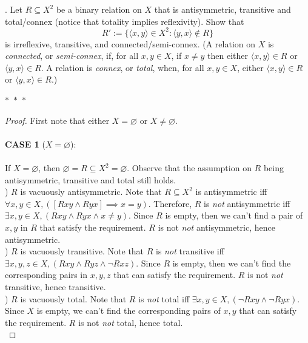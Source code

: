 \documentclass[12pt]{article}
\begin{document}
\newpage
{}. Let $R \subseteq X^2$ be a binary relation on $X$ that is antisymmetric, 
transitive and total/connex (notice that totality implies reflexivity). Show that 
$$R' := \{\langle x,y \rangle \in X^2: \langle y, x \rangle \notin R\}$$
\noindent
is irreflexive, transitive, and connected/semi-connex. (A relation on $X$  is \emph{connected}, 
or \emph{semi-connex}, if, for all $x,y \in X$, if $x\neq y$ then 
either $\langle x, y \rangle \in R$ or $\langle y, x \rangle \in R$. A relation 
is \emph{connex}, or \emph{total}, when, for all $x,y \in X$, either $\langle x, 
y \rangle \in R$ or $\langle y, x \rangle \in R$.)
\begin{center}
    $\ast$~$\ast$~$\ast$
\end{center}
\begin{proof}
    First note that either $X = \varnothing$ or $X \neq \varnothing$.\\
    \\
    \textbf{CASE 1 }($X = \varnothing$):\\
    \\
    If $X = \varnothing$, then $\varnothing = R \subseteq X^2 = \varnothing$. 
    Observe that the assumption on $R$ being antisymmetric, transitive and total still holds.\\
    
    ) $R$ is vacuously antisymmetric. Note that $R \subseteq X^2$ is antisymmetric iff
    $\forall x, y \in X, ([Rxy \wedge Ryx] \implies x = y)$. Therefore, $R$ is \emph{not} antisymmetric 
    iff $\exists x, y \in X, (Rxy \wedge Ryx \wedge x \neq y)$. Since $R$ is empty, then
    we can't find a pair of $x, y$ in $R$ that satisfy the requirement. $R$ is not \emph{not} 
    antisymmetric, hence antisymmetric.\\

    ) $R$ is vacuously transitive. Note that $R$ is \emph{not} transitive iff 
    $\exists x,y,z \in X, (Rxy \wedge Ryz \wedge \neg Rxz)$. Since $R$ is empty, then we can't find
    the corresponding pairs in $x,y,z$ that can satisfy the requirement. 
    $R$ is not \emph{not} transitive, hence transitive.\\
    
    ) $R$ is vacuously total. Note that $R$ is \emph{not} total iff
    $\exists x, y \in X, (\neg Rxy \wedge \neg Ryx)$. Since $X$ is empty, we can't find the
    corresponding pairs of $x, y$ that can satisfy the requirement. $R$ is not \emph{not} 
    total, hence total.\\


\end{proof}
\end{document}
